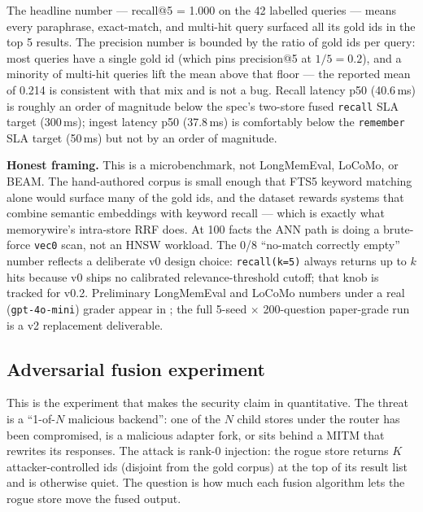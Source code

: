\documentclass[11pt,letterpaper,twocolumn]{article}
\begin{document}
The headline number --- recall@5 = 1.000 on the 42 labelled queries --- means every paraphrase, exact-match, and multi-hit query surfaced all its gold ids in the top 5 results. The precision number is bounded by the ratio of gold ids per query: most queries have a single gold id (which pins precision@5 at $1/5 = 0.2$), and a minority of multi-hit queries lift the mean above that floor --- the reported mean of 0.214 is consistent with that mix and is not a bug. Recall latency p50 (40.6\,ms) is roughly an order of magnitude below the spec's two-store fused \texttt{recall} SLA target (300\,ms); ingest latency p50 (37.8\,ms) is comfortably below the \texttt{remember} SLA target (50\,ms) but not by an order of magnitude.

\textbf{Honest framing.} This is a microbenchmark, not LongMemEval, LoCoMo, or BEAM. The hand-authored corpus is small enough that FTS5 keyword matching alone would surface many of the gold ids, and the dataset rewards systems that combine semantic embeddings with keyword recall --- which is exactly what memorywire's intra-store RRF does. At 100 facts the ANN path is doing a brute-force \texttt{vec0} scan, not an HNSW workload. The 0/8 ``no-match correctly empty'' number reflects a deliberate v0 design choice: \texttt{recall(k=5)} always returns up to $k$ hits because v0 ships no calibrated relevance-threshold cutoff; that knob is tracked for v0.2. Preliminary LongMemEval and LoCoMo numbers under a real (\texttt{gpt-4o-mini}) grader appear in ; the full 5-seed $\times$ 200-question paper-grade run is a v2 replacement deliverable.

\subsection{Adversarial fusion experiment}
\label{sec:eval-adversarial}

This is the experiment that makes the security claim in  quantitative. The threat is a ``1-of-$N$ malicious backend'': one of the $N$ child stores under the router has been compromised, is a malicious adapter fork, or sits behind a MITM that rewrites its responses. The attack is rank-0 injection: the rogue store returns $K$ attacker-controlled ids (disjoint from the gold corpus) at the top of its result list and is otherwise quiet. The question is how much each fusion algorithm lets the rogue store move the fused output.
\end{document}

